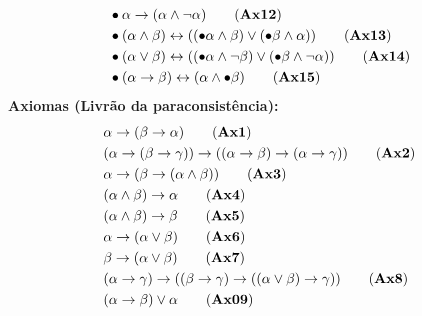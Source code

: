 \begin{definicao}[\lfium{}]
\begin{align*}
         & \bullet \alpha \rightarrow (\alpha \land \neg \alpha)\tag{\textbf{Ax12}}                                                                            \\
         & \bullet (\alpha \land \beta) \leftrightarrow ((\bullet \alpha \land \beta) \lor (\bullet \beta \land \alpha))\tag{\textbf{Ax13}}                    \\
         & \bullet (\alpha \lor \beta) \leftrightarrow ((\bullet \alpha \land \neg \beta) \lor (\bullet \beta \land \neg \alpha))\tag{\textbf{Ax14}}           \\
         & \bullet (\alpha \rightarrow \beta) \leftrightarrow (\alpha \land \bullet \beta)\tag{\textbf{Ax15}}
    \end{align*}
    \noindent\textbf{Axiomas (Livrão da paraconsistência):}
    \begin{align*}
         & \alpha \rightarrow (\beta \rightarrow \alpha)\tag{\textbf{Ax1}}                                                                                     \\
         & (\alpha \rightarrow (\beta \rightarrow \gamma)) \rightarrow ((\alpha \rightarrow \beta) \rightarrow (\alpha \rightarrow \gamma ))\tag{\textbf{Ax2}} \\
         & \alpha \rightarrow (\beta \rightarrow (\alpha \land \beta))\tag{\textbf{Ax3}}                                                                       \\
         & (\alpha \land \beta) \rightarrow \alpha\tag{\textbf{Ax4}}                                                                                           \\
         & (\alpha \land \beta) \rightarrow \beta\tag{\textbf{Ax5}}                                                                                            \\
         & \alpha \rightarrow (\alpha \lor \beta)\tag{\textbf{Ax6}}                                                                                            \\
         & \beta \rightarrow (\alpha \lor \beta)\tag{\textbf{Ax7}}                                                                                             \\
         & (\alpha \rightarrow \gamma) \rightarrow ((\beta \rightarrow \gamma) \rightarrow ((\alpha \lor \beta) \rightarrow \gamma))\tag{\textbf{Ax8}}         \\
         & (\alpha \rightarrow \beta) \lor \alpha\tag{\textbf{Ax09}}                                                                                           \\

\end{align*}
\end{definicao}
